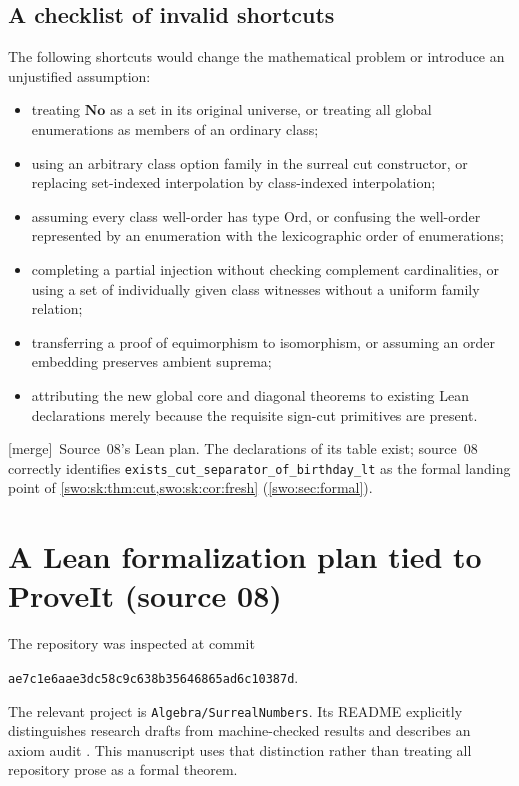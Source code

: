 \documentclass[11pt]{article}
\theoremstyle{definition}
\theoremstyle{remark}
\newcommand{\No}{\mathbf{No}}
\newcommand{\Ord}{\mathrm{Ord}}
\newcommand{\code}[1]{\texttt{\small #1}}
\newcommand{\merge}{\textsf{[merge]}}
\begin{document}
\subsection{A checklist of invalid shortcuts}
The following shortcuts would change the mathematical problem or
introduce an unjustified assumption:
\begin{itemize}
\item treating $\No$ as a set in its original universe, or treating all
global enumerations as members of an ordinary class;
\item using an arbitrary class option family in the surreal cut
constructor, or replacing set-indexed interpolation by class-indexed
interpolation;
\item assuming every class well-order has type $\Ord$, or confusing the
well-order represented by an enumeration with the lexicographic order
of enumerations;
\item completing a partial injection without checking complement
cardinalities, or using a set of individually given class witnesses
without a uniform family relation;
\item transferring a proof of equimorphism to isomorphism, or assuming
an order embedding preserves ambient suprema;
\item attributing the new global core and diagonal theorems to existing
Lean declarations merely because the requisite sign-cut primitives
are present.
\end{itemize}


\merge\ Source~08's Lean plan. The declarations of its table exist; source~08
correctly identifies \code{exists\_cut\_separator\_of\_birthday\_lt} as the
formal landing point of \cref{swo:sk:thm:cut,swo:sk:cor:fresh}
(\cref{swo:sec:formal}).

\section{A Lean formalization plan tied to ProveIt (source 08)}\label{swo:sk:sec:lean}

The repository was inspected at commit
\begin{center}
\texttt{ae7c1e6aae3dc58c9c638b35646865ad6c10387d}.
\end{center}
The relevant project is \texttt{Algebra/SurrealNumbers}. Its README
explicitly distinguishes research drafts from machine-checked results
and describes an axiom audit \cite{ProveItSurrealREADME}. This manuscript uses
that distinction rather than treating all repository prose as a
formal theorem.
\end{document}
